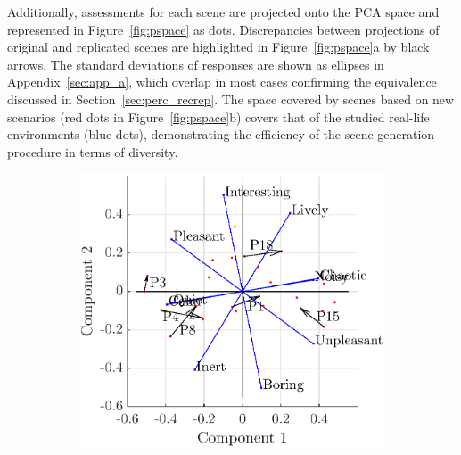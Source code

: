 \documentclass[11pt,a4paper]{article}
\begin{document}
Additionally, assessments for each scene are projected onto the PCA space and represented in Figure~\ref{fig:pspace} as dots. Discrepancies between projections of original and replicated scenes are highlighted in Figure~\ref{fig:pspace}a by black arrows. The standard deviations of responses are shown as ellipses in Appendix~\ref{sec:app_a}, which overlap in most cases confirming the equivalence discussed in Section~\ref{sec:perc_recrep}. The space covered by scenes based on new scenarios (red dots in Figure~\ref{fig:pspace}b) covers that of the studied real-life environments (blue dots), demonstrating the efficiency of the scene generation procedure in terms of diversity.

\begin{figure}[h]
    \centering
     \begin{subfigure}[t]{0.5\textwidth}
        \centering
        \includegraphics[width=\textwidth]{figures/pca_rep.eps}
    \end{subfigure}%
    \begin{subfigure}[t]{0.5\textwidth}
        \centering

\end{subfigure}
\end{figure}
\end{document}
